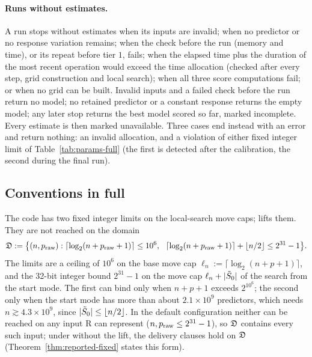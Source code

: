 \paragraph{Runs without estimates.} A run stops without estimates when its inputs are invalid; when no predictor or no
response variation remains; when the check before the run (memory and time), or its repeat before tier $1$, fails; when
the elapsed time plus the duration of the most recent operation would exceed the time allocation (checked after every
step, grid construction and local search); when all three score computations fail; or when no grid can be built.
Invalid inputs and a failed check before the run return no model; no retained predictor or a constant response returns
the empty model; any later stop returns the best model scored so far, marked incomplete. Every estimate is then marked
unavailable. Three cases end instead with an error and return nothing: an invalid allocation, and a violation of either
fixed integer limit of Table~\ref{tab:params-full} (the first is detected after the calibration, the second during the final
run).


\subsection{Conventions in full}\label{app:conventions}

The code has two fixed integer limits on the local-search move caps;  lifts them. They are not reached on the
domain
\[
  \Dom:=\big\{(n,\praw):\lceil\log_2(n+\praw+1)\rceil\le10^6,\ \ \lceil\log_2(n+\praw+1)\rceil+\lfloor n/2\rfloor\le2^{31}-1\big\}.
\]
The limits are a ceiling of $10^6$ on the base move cap $\ell_n:=\lceil\log_2(n+p+1)\rceil$, and the 32-bit integer bound
$2^{31}-1$ on the move cap $\ell_n+\lvert \tilde S_0\rvert$ of the search from the start mode. The first can bind only when $n+p+1$
exceeds $2^{10^6}$; the second only when the start mode has more than about $2.1\times10^9$ predictors, which needs
$n\gtrsim4.3\times10^9$, since $\lvert \tilde S_0\rvert\le\lfloor n/2\rfloor$. In the default configuration neither can be reached on
any input R can represent ($n,p_{\mathrm{raw}}\le2^{31}-1$), so $\mathfrak D$ contains every such input; under  without the lift,
the delivery clauses hold on $\mathfrak D$ (Theorem~\ref{thm:reported-fixed} states this form).


